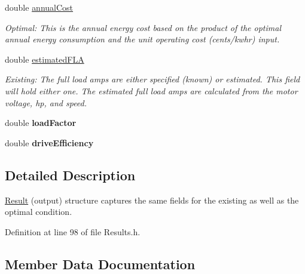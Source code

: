\begin{DoxyCompactItemize}
double \hyperlink{struct_p_s_a_t_result_1_1_result_a48964ead4e8849f21c2015e226d046cc}{annual\+Cost}
\begin{DoxyCompactList}\small\item\em Optimal\+: This is the annual energy cost based on the product of the optimal annual energy consumption and the unit operating cost (cents/kwhr) input. \end{DoxyCompactList}\item 
\mbox{\label{struct_p_s_a_t_result_1_1_result_ac606acff40adbc7e4b456e37fc0cc2a1}} 
double \hyperlink{struct_p_s_a_t_result_1_1_result_ac606acff40adbc7e4b456e37fc0cc2a1}{estimated\+F\+LA}
\begin{DoxyCompactList}\small\item\em Existing\+: The full load amps are either specified (known) or estimated. This field will hold either one. The estimated full load amps are calculated from the motor voltage, hp, and speed. \end{DoxyCompactList}\item 
\mbox{\label{struct_p_s_a_t_result_1_1_result_a1d75b6f47ebf7c7ed3e1288fa28aa121}} 
double {\bfseries load\+Factor}
\item 
\mbox{\label{struct_p_s_a_t_result_1_1_result_a1af0a7c1d2068a4bbaa3c495a5ebc085}} 
double {\bfseries drive\+Efficiency}
\end{DoxyCompactItemize}


\subsection{Detailed Description}
\hyperlink{struct_p_s_a_t_result_1_1_result}{Result} (output) structure captures the same fields for the existing as well as the optimal condition. 

Definition at line 98 of file Results.\+h.



\subsection{Member Data Documentation}
\mbox{\label{struct_p_s_a_t_result_1_1_result_a48964ead4e8849f21c2015e226d046cc}} 
